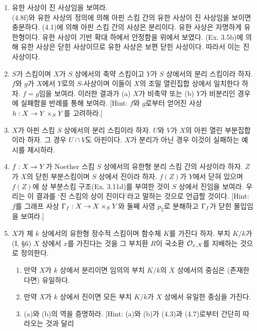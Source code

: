 	
	\begin{enumerate}[label=\tb{4.\arabic*.},itemindent=0mm,itemsep=4mm]
	\item 유한 사상이 진 사상임을 보여라.\\
	\sol (4.8f)와 유한 사상의 정의에 의해 아핀 스킴 간의 유한 사상이 진 사상임을 보이면 충분하다.
	(4.1)에 의해 아핀 스킴 간의 사상은 분리이다. 유한 사상은 자명하게 유한형이다. 유한 사상이 기반 확대 하에서 안정함을 위에서 보였다.
	(Ex. 3.5b)에 의해 유한 사상은 닫힌 사상이므로 유한 사상은 보편 닫힌 사상이다. 따라서 이는 진 사상이다.
	\item $S$가 스킴이며 $X$가 $S$ 상에서의 축약 스킴이고 $Y$가 $S$ 상에서의 분리 스킴이라 하자.
	$f$와 $g$가 $X$에서 $Y$로의 $S$-사상이며 이들이 $X$의 조밀 열린집합 상에서 일치한다 하자. $f=g$임을 보여라.
	이러한 결과가 (a) $X$가 비축약 또는 (b) $Y$가 비분리인 경우에 실패함을 반례를 통해 보여라.
	[Hint: $f$와 $g$로부터 얻어진 사상 $h:X\rightarrow Y\times_SY$를 고려하라.]\\
	\sol
	\item $X$가 아핀 스킴 $S$ 상에서의 분리 스킴이라 하자. $U$와 $V$가 $X$의 아핀 열린 부분집합이라 하자.
	그 경우 $U\cap V$도 아핀이다. $X$가 분리가 아닌 경우 이것이 실패하는 예시를 제시하라.\\
	\sol
	\item $f:X\rightarrow Y$가 Noether 스킴 $S$ 상에서의 유한형 분리 스킴 간의 사상이라 하자.
	$Z$가 $X$의 닫힌 부분스킴이며 $S$ 상에서 진이라 하자.
	$f(Z)$가 $Y$에서 닫혀 있으며 $f(Z)$에 상 부분스킴 구조(Ex. 3.11d)를 부여한 것이 $S$ 상에서 진임을 보여라.
	우리는 이 결과를 `진 스킴의 상이 진이다'라고 말하는 것으로 언급할 것이다.
	[Hint: $f$를 그래프 사상 $\Gamma_f:X\rightarrow X\times_SY$와 둘째 사영 $p_2$로 분해하고 $\Gamma_f$가 닫힌 몰입임을 보여라.]\\
	\sol
	\item $X$가 체 $k$ 상에서의 유한형 정수적 스킴이며 함수체 $K$를 가진다 하자.
	부치 $K/k$가 (I, \S 6) $X$ 상에서  $x$를 가진다는 것을
	그 부치환 $R$이 국소환 $\mathcal{O}_{x,X}$를 지배하는 것으로 정의한다.
	\begin{enumerate}[label=(\alph*)]
	\item 만약 $X$가 $k$ 상에서 분리이면 임의의 부치 $K/k$의 $X$ 상에서의 중심은 (존재한다면) 유일하다.
	\item 만약 $X$가 $k$ 상에서 진이면 모든 부치 $K/k$가 $X$ 상에서 유일한 중심을 가진다.
	\end{enumerate}
	\begin{enumerate}[label=*(\alph*)]
	\setcounter{enumii}{2}
	\item (a)와 (b)의 역을 증명하라. [Hint: (a)와 (b)가 (4.3)과 (4.7)로부터 간단히 따라오는 것과 달리

\end{enumerate}
\end{enumerate}
